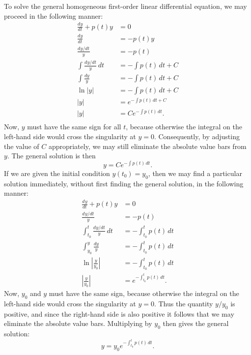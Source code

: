 \documentclass{myart}
\newcommand{\deriv}[3][]{\frac{d^{#1}#2}{d#3^{#1}}}
\newcommand{\fderiv}[3][]{d^{#1}#2/d#3^{#1}}
\begin{document}
To solve the general homogeneous first-order linear differential
equation, we may proceed in the following manner:
\begin{align*}
  \deriv{y}{t} + p(t)y &= 0 \\
  \deriv{y}{t} &= -p(t)y \\
  \frac{\fderiv{y}{t}}{y} &= -p(t) \\
  \int \frac{\fderiv{y}{t}}{y} \,dt &= -\int p(t) \,dt + C \\
  \int \frac{dy}{y} &= -\int p(t) \,dt + C \\
  \ln |y| &= -\int p(t) \,dt + C \\
  |y| &= e^{-\int p(t) \,dt + C} \\
  |y| &= Ce^{-\int p(t) \,dt}. \\
\end{align*}
Now, $y$ must have the same sign for all $t$, because otherwise the
integral on the left-hand side would cross the singularity at $y = 0$.
Consequently, by adjusting the value of $C$ appropriately, we may
still eliminate the absolute value bars from $y$. The general solution
is then
\begin{equation*}
  y = Ce^{-\int p(t) \,dt}.
\end{equation*}
If we are given the initial condition $y(t_0) = y_0$, then we may find
a particular solution immediately, without first finding the general
solution, in the following manner:
\begin{align*}
  \deriv{y}{t} + p(t)y &= 0 \\
  \frac{\fderiv{y}{t}}{y} &= -p(t) \\
  \int_{t_0}^t \frac{\fderiv{y}{t}}{y} \,dt &= -\int_{t_0}^t p(t) \,dt \\
  \int_{y_0}^y \frac{dy}{y} &= -\int_{t_0}^t p(t) \,dt \\
  \ln \left|\frac{y}{y_0}\right| &= -\int_{t_0}^t p(t) \,dt \\
  \left|\frac{y}{y_0}\right| &= e^{-\int_{t_0}^t p(t) \,dt}.
\end{align*}
Now, $y_0$ and $y$ must have the same sign, because otherwise the
integral on the left-hand side would cross the singularity at $y = 0$.
Thus the quantity $y/y_0$ is positive, and since the right-hand side
is also positive it follows that we may eliminate the absolute value
bars. Multiplying by $y_0$ then gives the general solution:
\begin{equation*}
  y = y_0e^{-\int_{t_0}^t p(t) \,dt}.
\end{equation*}
\end{document}
